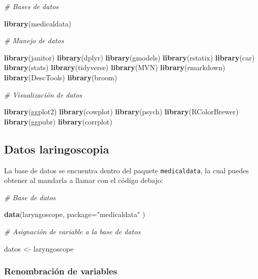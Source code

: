 \documentclass[
]{article}
\newenvironment{Shaded}{\begin{snugshade}}{\end{snugshade}}
\newcommand{\AttributeTok}[1]{\textcolor[rgb]{0.13,0.29,0.53}{#1}}
\newcommand{\CommentTok}[1]{\textcolor[rgb]{0.56,0.35,0.01}{\textit{#1}}}
\newcommand{\FunctionTok}[1]{\textcolor[rgb]{0.13,0.29,0.53}{\textbf{#1}}}
\newcommand{\NormalTok}[1]{#1}
\newcommand{\OtherTok}[1]{\textcolor[rgb]{0.56,0.35,0.01}{#1}}
\newcommand{\StringTok}[1]{\textcolor[rgb]{0.31,0.60,0.02}{#1}}
\begin{document}
\begin{Shaded}
\begin{Highlighting}[]
\CommentTok{\# Bases de datos}

\FunctionTok{library}\NormalTok{(medicaldata)}

\CommentTok{\# Manejo de datos}

\FunctionTok{library}\NormalTok{(janitor)}
\FunctionTok{library}\NormalTok{(dplyr)}
\FunctionTok{library}\NormalTok{(gmodels)}
\FunctionTok{library}\NormalTok{(rstatix)}
\FunctionTok{library}\NormalTok{(car)}
\FunctionTok{library}\NormalTok{(stats)}
\FunctionTok{library}\NormalTok{(tidyverse)}
\FunctionTok{library}\NormalTok{(MVN)}
\FunctionTok{library}\NormalTok{(rmarkdown) }
\FunctionTok{library}\NormalTok{(DescTools)}
\FunctionTok{library}\NormalTok{(broom)}

\CommentTok{\# Visualización de datos}

\FunctionTok{library}\NormalTok{(ggplot2)}
\FunctionTok{library}\NormalTok{(cowplot)}
\FunctionTok{library}\NormalTok{(psych)}
\FunctionTok{library}\NormalTok{(RColorBrewer)}
\FunctionTok{library}\NormalTok{(ggpubr)}
\FunctionTok{library}\NormalTok{(corrplot)}
\end{Highlighting}
\end{Shaded}

\hypertarget{datos-laringoscopia}{%
\subsection{Datos laringoscopia}\label{datos-laringoscopia}}

La base de datos se encuentra dentro del paquete \texttt{medicaldata},
la cual puedes obtener al mandarla a llamar con el código debajo:

\begin{Shaded}
\begin{Highlighting}[]
\CommentTok{\# Base de datos}

\FunctionTok{data}\NormalTok{(laryngoscope, }\AttributeTok{package=}\StringTok{"medicaldata"}\NormalTok{ )}

\CommentTok{\# Asignación de variable a la base de datos}

\NormalTok{datos }\OtherTok{\textless{}{-}}\NormalTok{ laryngoscope}
\end{Highlighting}
\end{Shaded}

\hypertarget{renombraciuxf3n-de-variables}{%
\subsubsection{Renombración de
variables}\label{renombraciuxf3n-de-variables}}
\end{document}
